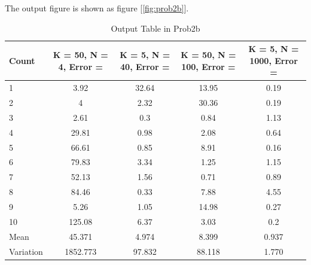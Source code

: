 \documentclass{article}
\begin{document}
The output figure is shown as figure [\ref{fig:prob2b}].
\begin{table}[htbp]
  \centering
  \begin{tabular}{|l|c|c|c|c|}
  \hline
  Count     & K = 50, N = 4, Error = & K = 5, N = 40, Error = & K = 50, N = 100, Error = & K = 5, N = 1000, Error = \\ \hline
  1         & 3.92                    & 32.64                   & 13.95                   & 0.19                    \\ \hline
  2         & 4                       & 2.32                    & 30.36                   & 0.19                    \\ \hline
  3         & 2.61                    & 0.3                     & 0.84                    & 1.13                    \\ \hline
  4         & 29.81                   & 0.98                    & 2.08                    & 0.64                    \\ \hline
  5         & 66.61                   & 0.85                    & 8.91                    & 0.16                    \\ \hline
  6         & 79.83                   & 3.34                    & 1.25                    & 1.15                    \\ \hline
  7         & 52.13                   & 1.56                    & 0.71                    & 0.89                    \\ \hline
  8         & 84.46                   & 0.33                    & 7.88                    & 4.55                    \\ \hline
  9         & 5.26                    & 1.05                    & 14.98                   & 0.27                    \\ \hline
  10        & 125.08                  & 6.37                    & 3.03                    & 0.2                     \\ \hline
  Mean      & 45.371                  & 4.974                   & 8.399                   & 0.937                   \\ \hline
  Variation & 1852.773            & 97.832            & 88.118       & 1.770            \\ \hline
  \end{tabular}
  \caption{Output Table in Prob2b}
  \label{table:prob2b}
\end{table}
\end{document}
